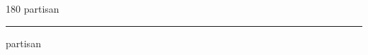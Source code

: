 
\begin{frame}
\begin{center}
\begin{turn}{180}
{\fontsize{2.5cm}{1em}\selectfont partisan}
\end{turn}
\vspace{1em}\par  
\hrule
\vspace{1em}\par  
{\fontsize{2.5cm}{1em}\selectfont partisan}
\end{center}
\end{frame}
